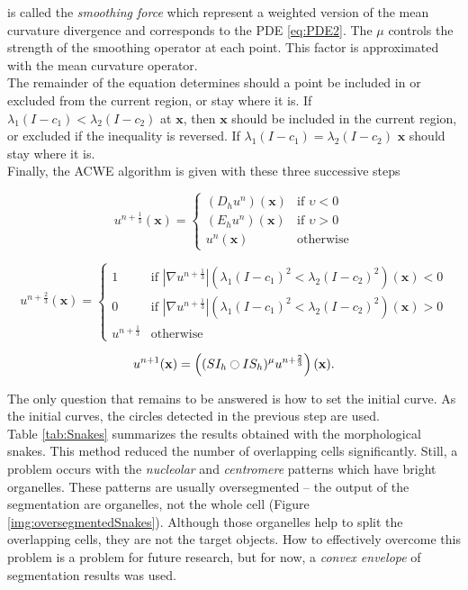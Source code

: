 is called the \textit{smoothing force} which represent a weighted version of the mean curvature divergence and corresponds to the PDE \ref{eq:PDE2}. The $\mu$ controls the strength of the smoothing operator at each point. This factor is approximated with the mean curvature operator. \\

The remainder of the equation determines should a point be included in or excluded from the current region, or stay where it is. If $\lambda_1(I - c_1) < \lambda_2 (I - c_2) $ at $\mathbf{x}$, then $\mathbf{x}$ should be included in the current region, or excluded if the inequality is reversed. If $\lambda_1(I - c_1) = \lambda_2 (I - c_2) $ $\mathbf{x}$ should stay where it is. \\

Finally, the ACWE algorithm is given with these three successive steps

\begin{equation}
	u^{n + \frac{1}{3}}(\mathbf{x}) = 
	\begin{cases}
		(D_hu^n)(\mathbf{x}) & \text{if } \upsilon < 0 \\
		(E_hu^n)(\mathbf{x}) & \text{if } \upsilon > 0 \\
		u^n(\mathbf{x}) & \text{otherwise}
	\end{cases}
\end{equation}

\begin{equation}
	u^{n + \frac{2}{3}}(\mathbf{x}) = 
	\begin{cases}
		1 &\text{if } |\nabla u^{n + \frac{1}{3}}|(\lambda_1(I - c_1)^2 < \lambda_2 (I - c_2)^2)(\mathbf{x}) < 0 \\
		0 &\text{if } |\nabla u^{n + \frac{1}{3}}|(\lambda_1(I - c_1)^2 < \lambda_2 (I - c_2)^2)(\mathbf{x}) > 0 \\
		u^{n + \frac{1}{3}} & \text{otherwise}
	\end{cases}
\end{equation}

\begin{equation}
	u^{n + 1}(\mathbf{x}) = \left ( (SI_h \ocircle IS_h)^{\mu} u ^{n + \frac{2}{3}}  \right )(\mathbf{x}).
\end{equation}

The only question that remains to be answered is how to set the initial curve. As the initial curves, the circles detected in the previous step are used. \\

Table \ref{tab:Snakes} summarizes the results obtained with the morphological snakes. This method reduced the number of overlapping cells significantly. Still, a problem occurs with the \textit{nucleolar} and \textit{centromere} patterns which have bright organelles. These patterns are usually oversegmented -- the output of the segmentation are organelles, not the whole cell (Figure \ref{img:oversegmentedSnakes}). Although those organelles help to split the overlapping cells, they are not the target objects. How to effectively  overcome this problem is a problem for future research, but for now, a \textit{convex envelope} of segmentation results was used. \\ 

